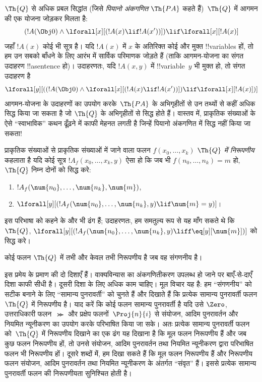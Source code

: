 \documentclass[../../../include/open-logic-section]{subfiles}
\begin{document}
$\Th{Q}$ से अधिक प्रबल सिद्धांत (जिसे \emph{पियानो अंकगणित} $\Th{PA}$ कहते
हैं)~$\Th{Q}$ में आगमन की एक योजना जोड़कर मिलता है:
\[
(!A(\Obj 0) \land \lforall[x][(!A(x) \lif !A(x'))]) \lif \lforall[x][!A(x)]
\]
जहाँ $!A(x)$ कोई भी सूत्र है। यदि $!A(x)$ में $x$ के अतिरिक्त कोई और मुक्त
!!{variable}s हों, तो हम उन सबको बाँधने के लिए आरंभ में सार्विक परिमाणक
जोड़ते हैं (ताकि आगमन-योजना का संगत उदाहरण !!a{sentence} हो)। उदाहरणतः,
यदि $!A(x, y)$ में !!{variable}~$y$ भी मुक्त हो, तो संगत उदाहरण है
\[
\lforall[y][((!A(\Obj 0) \land \lforall[x][(!A(x) \lif !A(x'))]) \lif
  \lforall[x][!A(x)])]
\]
आगमन-योजना के उदाहरणों का उपयोग करके~$\Th{PA}$ के अभिगृहीतों से उन तथ्यों
से कहीं अधिक सिद्ध किया जा सकता है जो $\Th{Q}$ के अभिगृहीतों से सिद्ध होते
हैं। वास्तव में, प्राकृतिक संख्याओं के ऐसे ``स्वाभाविक'' कथन ढूँढ़ने में
काफी मेहनत लगती है जिन्हें पियानो अंकगणित में सिद्ध नहीं किया जा सकता!{}

\begin{defn}
  प्राकृतिक संख्याओं से प्राकृतिक संख्याओं में जाने वाला फलन
  $f(x_0,\ldots,x_k)$ {\em $\Th{Q}$ में निरूपणीय} कहलाता है यदि कोई सूत्र
  $!A_f(x_0,\dots,x_k,y)$ ऐसा हो कि जब भी $f(n_0,\dots,n_k) = m$ हो,
  $\Th{Q}$ निम्न दोनों को सिद्ध करे:
\begin{enumerate}
\item{} $!A_f(\num{n_0}, \dots, \num{n_k}, \num{m})$,
\item{} $\lforall[y][(!A_f(\num{n_0}, \dots,
\num{n_k}, y) \lif \num{m} = y)]$।
\end{enumerate}
\end{defn}

इस परिभाषा को कहने के और भी ढंग हैं; उदाहरणतः, हम समतुल्य रूप से यह माँग
सकते थे कि $\Th{Q}$,
$\lforall[y][(!A_f(\num{n_0}, \dots, \num{n_k}, y) \liff
\eq[y][\num{m}])]$ को सिद्ध करे।

\begin{thm}
कोई फलन $\Th{Q}$ में तभी और केवल तभी निरूपणीय है जब वह संगणनीय है।
\end{thm}

इस प्रमेय के प्रमाण की दो दिशाएँ हैं। वाक्यविन्यास का अंकगणितीकरण उपलब्ध
हो जाने पर बाएँ-से-दाएँ दिशा काफी सीधी है। दूसरी दिशा के लिए अधिक काम
चाहिए। मूल विचार यह है: हम ``संगणनीय'' को सटीक बनाने के लिए ``सामान्य
पुनरावर्ती'' को चुनते हैं और दिखाते हैं कि प्रत्येक सामान्य पुनरावर्ती फलन
$\Th{Q}$ में निरूपणीय है। याद करें कि कोई फलन सामान्य पुनरावर्ती है यदि
उसे $\Zero$, उत्तराधिकारी फलन~$\Succ$ और प्रक्षेप फलनों~$\Proj{n}{i}$ से
संयोजन, आदिम पुनरावर्तन और नियमित न्यूनीकरण का उपयोग करके परिभाषित किया जा
सके। अतः प्रत्येक सामान्य पुनरावर्ती फलन को~$\Th{Q}$ में निरूपणीय दिखाने
का एक ढंग यह दिखाना है कि मूल फलन निरूपणीय हैं और जब कुछ फलन निरूपणीय हों,
तो उनसे संयोजन, आदिम पुनरावर्तन तथा नियमित न्यूनीकरण द्वारा परिभाषित फलन भी
निरूपणीय हों। दूसरे शब्दों में, हम दिखा सकते हैं कि मूल फलन निरूपणीय हैं
और निरूपणीय फलन संयोजन, आदिम पुनरावर्तन तथा नियमित न्यूनीकरण के अंतर्गत
``संवृत'' हैं। इससे प्रत्येक सामान्य पुनरावर्ती फलन की निरूपणीयता सुनिश्चित
होती है।
\end{document}
